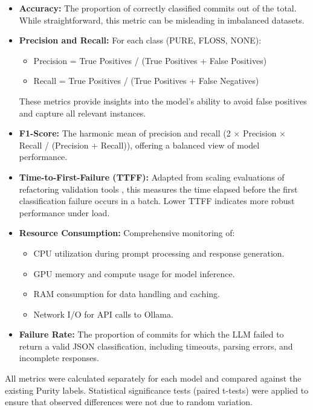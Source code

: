 \begin{itemize}
    \item \textbf{Accuracy:} The proportion of correctly classified commits out of the total. While straightforward, this metric can be misleading in imbalanced datasets.
    
    \item \textbf{Precision and Recall:} For each class (PURE, FLOSS, NONE):
    \begin{itemize}
        \item Precision = True Positives / (True Positives + False Positives)
        \item Recall = True Positives / (True Positives + False Negatives)
    \end{itemize}
    These metrics provide insights into the model's ability to avoid false positives and capture all relevant instances.
    
    \item \textbf{F1-Score:} The harmonic mean of precision and recall (2 × Precision × Recall / (Precision + Recall)), offering a balanced view of model performance.
    
    \item \textbf{Time-to-First-Failure (TTFF):} Adapted from scaling evaluations of refactoring validation tools \cite{mongiovi2015scaling}, this measures the time elapsed before the first classification failure occurs in a batch. Lower TTFF indicates more robust performance under load.
    
    \item \textbf{Resource Consumption:} Comprehensive monitoring of:
    \begin{itemize}
        \item CPU utilization during prompt processing and response generation.
        \item GPU memory and compute usage for model inference.
        \item RAM consumption for data handling and caching.
        \item Network I/O for API calls to Ollama.
    \end{itemize}
    
    \item \textbf{Failure Rate:} The proportion of commits for which the LLM failed to return a valid JSON classification, including timeouts, parsing errors, and incomplete responses.
\end{itemize}

All metrics were calculated separately for each model and compared against the existing Purity labels. Statistical significance tests (paired t-tests) were applied to ensure that observed differences were not due to random variation.

